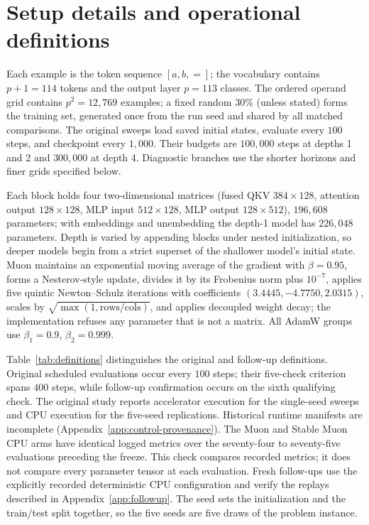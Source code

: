 \section{Setup details and operational definitions}
\label{app:setup}




Each example is the token sequence $[a,b,=]$; the vocabulary contains $p+1=114$ tokens and the output layer $p=113$ classes. The ordered operand grid contains $p^2=12{,}769$ examples; a fixed random $30\%$ (unless stated) forms the training set, generated once from the run seed and shared by all matched comparisons. The original sweeps load saved initial states, evaluate every $100$ steps, and checkpoint every $1{,}000$. Their budgets are $100{,}000$ steps at depths 1 and 2 and $300{,}000$ at depth 4. Diagnostic branches use the shorter horizons and finer grids specified below.

Each block holds four two-dimensional matrices (fused QKV $384\times128$, attention output $128\times128$, MLP input $512\times128$, MLP output $128\times512$), $196{,}608$ parameters; with embeddings and unembedding the depth-1 model has $226{,}048$ parameters. Depth is varied by appending blocks under nested initialization, so deeper models begin from a strict superset of the shallower model's initial state. Muon maintains an exponential moving average of the gradient with $\beta=0.95$, forms a Nesterov-style update, divides it by its Frobenius norm plus $10^{-7}$, applies five quintic Newton--Schulz iterations with coefficients $(3.4445,-4.7750,2.0315)$, scales by $\sqrt{\max(1,\text{rows}/\text{cols})}$, and applies decoupled weight decay; the implementation refuses any parameter that is not a matrix. All AdamW groups use $\beta_1=0.9$, $\beta_2=0.999$.

Table~\ref{tab:definitions} distinguishes the original and follow-up definitions. Original scheduled evaluations occur every $100$ steps; their five-check criterion spans $400$ steps, while follow-up confirmation occurs on the sixth qualifying check. The original study reports accelerator execution for the single-seed sweeps and CPU execution for the five-seed replications. Historical runtime manifests are incomplete (Appendix~\ref{app:control-provenance}). The Muon and Stable Muon CPU arms have identical logged metrics over the seventy-four to seventy-five evaluations preceding the freeze. This check compares recorded metrics; it does not compare every parameter tensor at each evaluation. Fresh follow-ups use the explicitly recorded deterministic CPU configuration and verify the replays described in Appendix~\ref{app:followup}. The seed sets the initialization and the train/test split together, so the five seeds are five draws of the problem instance.

